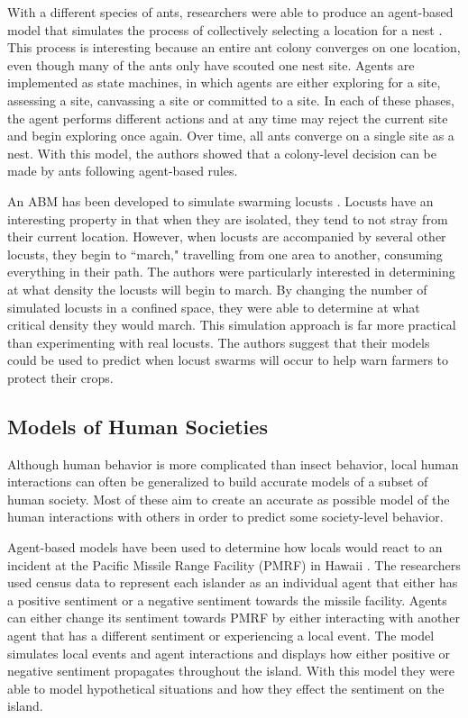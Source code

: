 With a different species of ants, researchers were able to produce an agent-based model that simulates the process of collectively selecting a location for a nest \cite{pratt2005agent}.
This process is interesting because an entire ant colony converges on one location, even though many of the ants only have scouted one nest site.
Agents are implemented as state machines, in which agents are either exploring for a site, assessing a site, canvassing a site or committed to a site.
In each of these phases, the agent performs different actions and at any time may reject the current site and begin exploring once again.
Over time, all ants converge on a single site as a nest.
With this model, the authors showed that a colony-level decision can be made by ants following agent-based rules.

An ABM has been developed to simulate swarming locusts \cite{buhl2006dom}.
Locusts have an interesting property in that when they are isolated, they tend to not stray from their current location.
However, when locusts are accompanied by several other locusts, they begin to ``march," travelling from one area to another, consuming everything in their path.
The authors were particularly interested in determining at what density the locusts will begin to march.
By changing the number of simulated locusts in a confined space, they were able to determine at what critical density they would march.
This simulation approach is far more practical than experimenting with real locusts.
The authors suggest that their models could be used to predict when locust swarms will occur to help warn farmers to protect their crops.


\subsection{Models of Human Societies}

Although human behavior is more complicated than insect behavior, local human interactions can often be generalized to build accurate models of a subset of human society.
Most of these aim to create an accurate as possible model of the human interactions with others in order to predict some society-level behavior.

Agent-based models have been used to determine how locals would react to an incident at the Pacific Missile Range Facility (PMRF) in Hawaii \cite{zanbaka}.
The researchers used census data to represent each islander as an individual agent that either has a positive sentiment or a negative sentiment towards the missile facility.
Agents can either change its sentiment towards PMRF by either interacting with another agent that has a different sentiment or experiencing a local event.
The model simulates local events and agent interactions and displays how either positive or negative sentiment propagates throughout the island.
With this model they were able to model hypothetical situations and how they effect the sentiment on the island.

